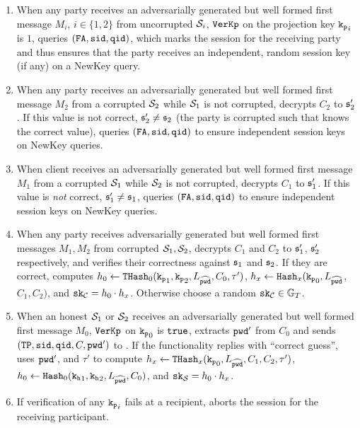\begin{enumerate}
  \item When any party receives an adversarially generated but well formed first message $M_i$, $i\in\{1,2\}$ from uncorrupted $\mathcal{S}_i$, \ie $\mathtt{VerKp}$ on the projection key $\mathtt{k_p}_i$ is $1$, \SIM queries $(\mathtt{FA}, \mathtt{sid}, \mathtt{qid})$, which marks the session \failed for the receiving party and thus ensures that the party receives an independent, random session key (if any) on a NewKey query.
        
  \item When any party receives an adversarially generated but well formed first message $M_2$ from a corrupted $\mathcal{S}_2$ while $\mathcal{S}_1$ is not corrupted, \SIM decrypts $C_2$ to $\mathfrak{s}'_2$.
        If this value is not correct, $\mathfrak{s}'_2\not=\mathfrak{s}_2$ (the party is corrupted such that \SIM knows the correct value), \SIM queries $(\mathtt{FA}, \mathtt{sid}, \mathtt{qid})$ to ensure independent session keys on NewKey queries.    
        
  \item When client \Client receives an adversarially generated but well formed first message $M_1$ from a corrupted $\mathcal{S}_1$ while $\mathcal{S}_2$ is not corrupted, \SIM decrypts $C_1$ to $\mathfrak{s}'_1$.
        If this value is \emph{not} correct, $\mathfrak{s}'_1\not=\mathfrak{s}_1$, \SIM queries $(\mathtt{FA}, \mathtt{sid}, \mathtt{qid})$ to ensure independent session keys on NewKey queries.    
        
  \item When any party receives adversarially generated but well formed first messages $M_1, M_2$ from corrupted $\mathcal{S}_1, \mathcal{S}_2$, \SIM decrypts $C_1$ and $C_2$ to $\mathfrak{s}'_1$, $\mathfrak{s}'_2$ respectively, and verifies their correctness against $\mathfrak{s}_1$ and $\mathfrak{s}_2$.
        If they are correct, \SIM computes $h_0\gets\mathtt{THash}_0(\mathtt{k_p}_1, \mathtt{k_p}_2,  L_{\widehat{\mathtt{pwd}}}, C_0, \tau')$, $h_x\gets\mathtt{Hash}_x(\mathtt{k_p}_0, L_{\widehat{\mathtt{pwd}}}$, $C_1, C_2)$, and $\mathtt{sk}_\mathcal{C}=h_0\cdot h_x$.
        Otherwise choose a random $\mathtt{sk}_\mathcal{C}\in\mathbb{G}_T$.
         
  \item When an honest $\mathcal{S}_1$ or $\mathcal{S}_2$ receives an adversarially generated but well formed first message $M_0$, \ie $\mathtt{VerKp}$ on $\mathtt{k_p}_0$ is $\mathtt{true}$, \SIM extracts $\mathtt{pwd}'$ from $C_0$ and sends $(\mathtt{TP}, \mathtt{sid}, \mathtt{qid}, C, \mathtt{pwd}')$ to \FTWOPAKE.
        If the functionality replies with ``correct guess'', \SIM uses $\mathtt{pwd}'$, \crs and $\tau'$ to compute $h_x\gets\mathtt{THash}_x(\mathtt{k_p}_0, L_{\widehat{\mathtt{pwd}}}, C_1, C_2, \tau')$, $h_0\gets\mathtt{Hash}_0(\mathtt{k_h}_1, \mathtt{k_h}_2, L_{\widehat{\mathtt{pwd}}}, C_0)$, and $\mathtt{sk}_\mathcal{S}=h_0\cdot h_x$.
        
  \item If verification of any $\mathtt{k_p}_i$ fails at a recipient, \SIM aborts the session for the receiving participant.
\end{enumerate}  

